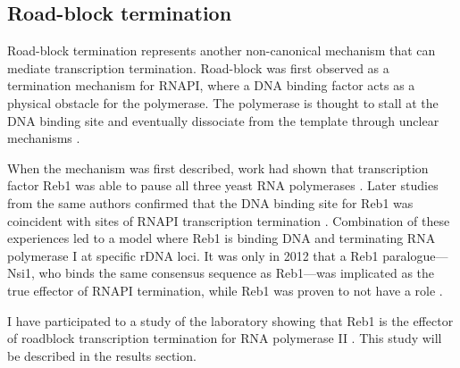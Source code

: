 \subsection{Road-block termination} \label{roadblockIntro}
  
Road-block termination represents another non-canonical mechanism that can mediate transcription termination. 
Road-block was first observed as a termination mechanism for RNAPI, where  a DNA binding factor acts as a physical obstacle for the polymerase. 
The polymerase is thought to stall at the DNA binding site and eventually dissociate from the template through unclear mechanisms \cite{lang:1994:model, lang:1993:reb1}. 

When the mechanism was first described, \invitro{} work had shown that transcription factor Reb1 was able to pause all three yeast RNA polymerases \cite{lang:1994:model}. 
Later studies from the same authors confirmed that the DNA binding site for Reb1 was coincident with sites of RNAPI transcription termination \invivo{} \cite{reeder:1999:saccharomyces}. 
Combination of these experiences led to a model where Reb1 is binding DNA and terminating RNA polymerase I at specific rDNA loci. 
It was only in 2012 that a Reb1 paralogue---Nsi1, who binds the same consensus sequence as Reb1---was implicated as the true \invivo{} effector of RNAPI termination, while Reb1 was proven to not have a role \cite{reiter:2012:reb1homologue}. 

I have participated to a study of the laboratory showing that Reb1 is the effector of roadblock transcription termination for RNA polymerase II \invivo{}. 
This study will be described in the results section.

\clearpage

\newpage
\mbox{}